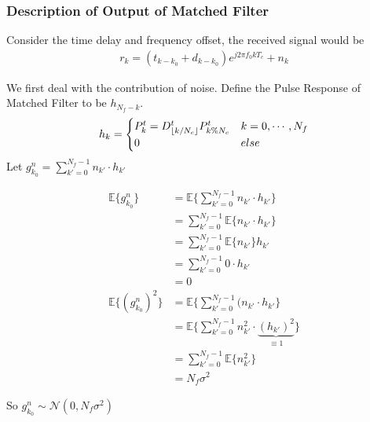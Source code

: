 \documentclass[a4paper]{article}
\DeclarePairedDelimiter\floor{\lfloor}{\rfloor}
\begin{document}
\subsubsection{Description of Output of Matched Filter} %
\label{ssub:description_of_output_of_matched_filter}
Consider the time delay and frequency offset, the received signal would be 
\begin{align}
	r_k = (t_{k - k_0} + d_{k - k_0}) e^{j 2\pi f_0 k T_c} + n_k
\end{align}

We first deal with the contribution of noise.
Define the Pulse Response of Matched Filter to be $h_{N_f-k}$.
\begin{align}
	h_k = 
	\begin{cases}
	P^t_{k} = D^t_{\floor{k/N_c}}P^t_{k\%N_c} & k = 0, \cdots, N_f\\
	0 	& else	
	\end{cases}
\end{align}
Let $g^n_{k_0}= \sum_{k' = 0}^{N_f-1} n_{k'} \cdot h_{k'}$

\begin{align}
	\mathbb{E} \{ g^n_{k_0}\}
	&= \mathbb{E} \{\sum_{k' = 0}^{N_f-1} n_{k'} \cdot h_{k'}\} \\
	&= \sum_{k' = 0}^{N_f-1} \mathbb{E} \{ n_{k'} \cdot h_{k'} \} \\
	&= \sum_{k' = 0}^{N_f-1} \mathbb{E} \{ n_{k'}\} h_{k'} \\
	&= \sum_{k' = 0}^{N_f-1} 0 \cdot h_{k'} \\
	&= 0\\
	\mathbb{E} \{ (g^n_{k_0})^2\}
	&= \mathbb{E} \{\sum_{k' = 0}^{N_f-1} (n_{k'} \cdot h_{k'}\} \\
	&= \mathbb{E} \{\sum_{k' = 0}^{N_f-1} n_{k'}^2 \cdot \underbrace{(h_{k'})^2}_{\equiv1}\} \\
	&= \sum_{k' = 0}^{N_f-1} \mathbb{E} \{n_{k'}^2 \}\\
	&= N_f \sigma^2
\end{align}

So $g^n_{k_0}\sim \mathcal{N} (0, N_f \sigma^2)$
\end{document}
